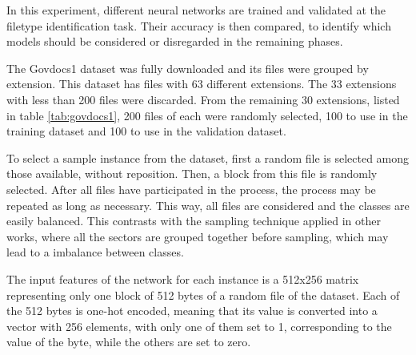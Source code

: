 In this experiment, different neural networks are trained and validated
at the filetype identification task. Their accuracy is then compared,
to identify which models should be considered or disregarded in the remaining phases.

The Govdocs1 dataset  was fully downloaded and its files were grouped by extension. This dataset has files with 63 different extensions. The 33 extensions with less than 200 files were discarded. From the remaining 30 extensions, listed in table \ref{tab:govdocs1}, 200 files of each were randomly selected, 100 to use in the training dataset and 100 to use in the validation dataset.



To select a sample instance from the dataset, first a random file is selected among those available, without reposition. Then, a block from this file is randomly selected. After all files have participated in the process, the process may be repeated as long as necessary. This way, all files are considered and the classes are easily balanced.
This contrasts with the sampling technique applied in other works, where all the sectors are grouped together before sampling, which may lead to a imbalance between classes.

The input features of the network for each instance is a 512x256 matrix representing only one block of 512 bytes of a random file of the dataset. Each of the 512 bytes is one-hot encoded, meaning that its value is converted into a vector with 256 elements, with only one of them set to 1, corresponding to the value of the byte, while the others are set to zero.


